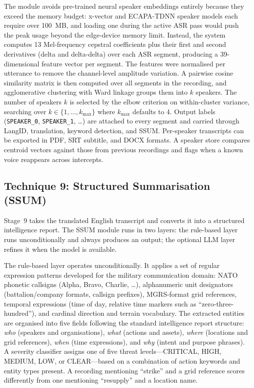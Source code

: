 \documentclass[12pt, onecolumn]{IEEEtran}
\begin{document}
The module avoids pre-trained neural speaker embeddings entirely because they exceed the memory budget: x-vector and ECAPA-TDNN speaker models each require over 100~MB, and loading one during the active ASR pass would push the peak usage beyond the edge-device memory limit. Instead, the system computes 13 Mel-frequency cepstral coefficients plus their first and second derivatives (delta and delta-delta) over each ASR segment, producing a 39-dimensional feature vector per segment. The features were normalised per utterance to remove the channel-level amplitude variation. A pairwise cosine similarity matrix is then computed over all segments in the recording, and agglomerative clustering with Ward linkage groups them into $k$ speakers. The number of speakers $k$ is selected by the elbow criterion on within-cluster variance, searching over $k \in \{1, \ldots, k_{\max}\}$ where $k_{\max}$ defaults to 4. Output labels (\texttt{SPEAKER\_0}, \texttt{SPEAKER\_1}, \ldots) are attached to every segment and carried through LangID, translation, keyword detection, and SSUM. Per-speaker transcripts can be exported in PDF, SRT subtitle, and DOCX formats. A speaker store compares centroid vectors against those from previous recordings and flags when a known voice reappears across intercepts.

\subsection{Technique 9: Structured Summarisation (SSUM)}
\label{sec:isum}

Stage~9 takes the translated English transcript and converts it into a structured intelligence report. The SSUM module runs in two layers: the rule-based layer runs unconditionally and always produces an output; the optional LLM layer refines it when the model is available.

The rule-based layer operates unconditionally. It applies a set of regular expression patterns developed for the military communication domain: NATO phonetic callsigns (Alpha, Bravo, Charlie, \ldots), alphanumeric unit designators (battalion/company formats, callsign prefixes), MGRS-format grid references, temporal expressions (time of day, relative time markers such as ``zero-three-hundred''), and cardinal direction and terrain vocabulary. The extracted entities are organised into five fields following the standard intelligence report structure: \textit{who} (speakers and organisations), \textit{what} (actions and assets), \textit{where} (locations and grid references), \textit{when} (time expressions), and \textit{why} (intent and purpose phrases). A severity classifier assigns one of five threat levels---CRITICAL, HIGH, MEDIUM, LOW, or CLEAR---based on a combination of action keywords and entity types present. A recording mentioning ``strike'' and a grid reference scores differently from one mentioning ``resupply'' and a location name.
\end{document}
